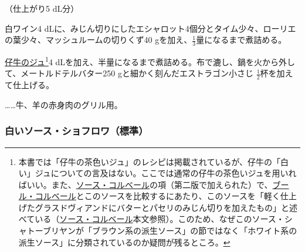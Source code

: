 \begin{recette}


（仕上がり5 dL分）

白ワイン4
dLに、みじん切りにしたエシャロット4個分とタイム少々、ローリエの葉少々、マッシュルームの切りくず40
gを加え、\(\frac{1}{3}\)量になるまで煮詰める。

\protect\hyperlink{jus-de-veau-brun}{仔牛のジュ}\footnote{本書では「仔牛の茶色いジュ」のレシピは掲載されているが、仔牛の「白い」ジュについての言及はない。ここでは通常の仔牛の茶色いジュを用いればいい。また、\protect\hyperlink{sauce-colbert}{ソース・コルベール}の項（第二版で加えられた）で、\protect\hyperlink{beurre-colbert}{ブール・コルベール}とこのソースを比較するにあたり、このソースを「軽く仕上げたグラスドヴィアンドにバターとパセリのみじん切りを加えたもの」と述べている（\protect\hyperlink{sauce-colbert}{ソース・コルベール}本文参照）。このため、なぜこのソース・シャトーブリヤンが「ブラウン系の派生ソース」の節ではなく「ホワイト系の派生ソース」に分類されているのか疑問が残るところ。}4
dLを加え、半量になるまで煮詰める。布で漉し、鍋を火から外して、メートルドテルバター250
gと細かく刻んだエストラゴン小さじ \(\frac{1}{2}\)杯を加えて仕上げる。

\ldots{}\ldots{}牛、羊の赤身肉のグリル用。

\atoaki{}

\hypertarget{sauce-chaud-froid-blanche-ordinaire}{%
\subsubsection{白いソース・ショフロワ（標準）}\label{sauce-chaud-froid-blanche-ordinaire}}




\end{recette}
